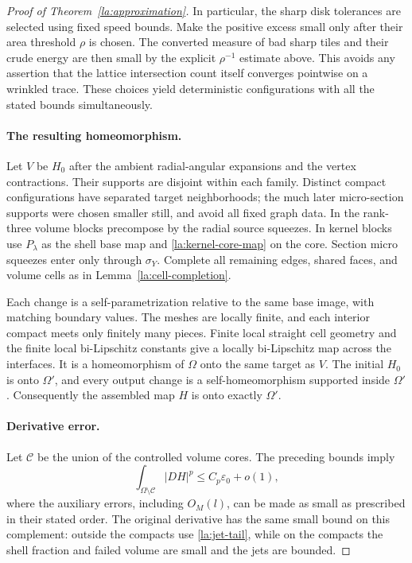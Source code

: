\begin{proof}[Proof of Theorem~\ref{la:approximation}]
In particular, the sharp disk tolerances are selected using fixed
speed bounds.  Make the positive excess small only after their area
threshold $\rho$ is chosen.  The converted measure of bad sharp
tiles and their crude energy are then small by the explicit
$\rho^{-1}$ estimate above.  This avoids any assertion that the
lattice intersection count itself converges pointwise on a
wrinkled trace.  These choices yield deterministic configurations
with all the stated bounds simultaneously.

\paragraph{The resulting homeomorphism.}
Let $V$ be $H_0$ after the ambient radial-angular expansions and the
vertex contractions.  Their supports are disjoint within each
family.  Distinct compact configurations have separated target
neighborhoods; the much later micro-section supports were chosen
smaller still, and avoid all fixed graph data.  In the rank-three
volume blocks precompose by the radial source squeezes.  In kernel
blocks use $P_\lambda$ as the shell base map and
\eqref{la:kernel-core-map} on the core.  Section micro squeezes enter
only through $\sigma_Y$.  Complete all remaining edges, shared faces,
and volume cells as in Lemma~\ref{la:cell-completion}.

Each change is a self-parametrization relative to the same base
image, with matching boundary values.  The meshes are locally finite,
and each interior compact meets only finitely many pieces.  Finite
local straight cell geometry and the finite local bi-Lipschitz
constants give a locally bi-Lipschitz map across the interfaces.
It is a homeomorphism of $\Omega$ onto the same target as $V$.
The initial $H_0$ is onto $\Omega'$, and every output change is a
self-homeomorphism supported inside $\Omega'$.  Consequently the
assembled map $H$ is onto exactly $\Omega'$.

\paragraph{Derivative error.}
Let $\mathcal C$ be the union of the controlled volume cores.  The
preceding bounds imply
\begin{equation}\label{la:outside-core-energy}
 \int_{\Omega\setminus\mathcal C}|DH|^p
       \le C_p\varepsilon_0+o(1),
\end{equation}
where the auxiliary errors, including $O_M(l)$, can be made as small
as prescribed in their stated order.  The original derivative has
the same small bound on this complement: outside the compacts use
\eqref{la:jet-tail}, while on the compacts the shell fraction and
failed volume are small and the jets are bounded.


\end{proof}
